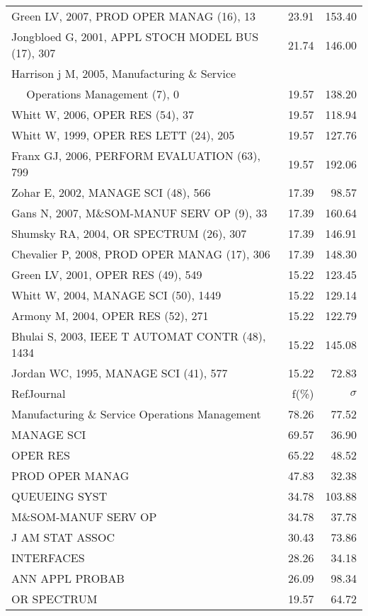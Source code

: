 \documentclass[a4paper,11pt]{report}
\begin{document}
\begin{landscape}
\begin{table}[!ht]
{\begin{tabular}{|l r r|}
Green LV, 2007, PROD OPER MANAG (16), 13 & 23.91 & 153.40\\
Jongbloed G, 2001, APPL STOCH MODEL BUS (17), 307 & 21.74 & 146.00\\
Harrison j M, 2005, Manufacturing \& Service &  & \\
$\quad$ Operations Management (7), 0 & 19.57 & 138.20\\
Whitt W, 2006, OPER RES (54), 37 & 19.57 & 118.94\\
Whitt W, 1999, OPER RES LETT (24), 205 & 19.57 & 127.76\\
Franx GJ, 2006, PERFORM EVALUATION (63), 799 & 19.57 & 192.06\\
Zohar E, 2002, MANAGE SCI (48), 566 & 17.39 & 98.57\\
Gans N, 2007, M\&SOM-MANUF SERV OP (9), 33 & 17.39 & 160.64\\
Shumsky RA, 2004, OR SPECTRUM (26), 307 & 17.39 & 146.91\\
Chevalier P, 2008, PROD OPER MANAG (17), 306 & 17.39 & 148.30\\
Green LV, 2001, OPER RES (49), 549 & 15.22 & 123.45\\
Whitt W, 2004, MANAGE SCI (50), 1449 & 15.22 & 129.14\\
Armony M, 2004, OPER RES (52), 271 & 15.22 & 122.79\\
Bhulai S, 2003, IEEE T AUTOMAT CONTR (48), 1434 & 15.22 & 145.08\\
Jordan WC, 1995, MANAGE SCI (41), 577 & 15.22 & 72.83\\
\hline
\hline
RefJournal & f(\%) & $\sigma$\\
\hline
Manufacturing \& Service Operations Management & 78.26 & 77.52\\
MANAGE SCI & 69.57 & 36.90\\
OPER RES & 65.22 & 48.52\\
PROD OPER MANAG & 47.83 & 32.38\\
QUEUEING SYST & 34.78 & 103.88\\
M\&SOM-MANUF SERV OP & 34.78 & 37.78\\
J AM STAT ASSOC & 30.43 & 73.86\\
INTERFACES & 28.26 & 34.18\\
ANN APPL PROBAB & 26.09 & 98.34\\
OR SPECTRUM & 19.57 & 64.72\\
\hline
\end{tabular}
}
\end{table}

\clearpage


\end{landscape}
\end{document}
